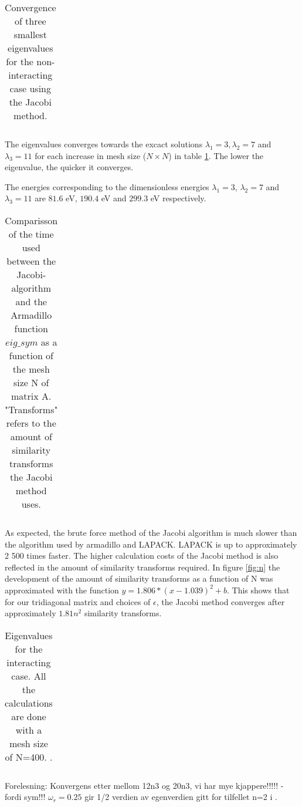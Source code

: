 
\begin{table}[H]\caption{Convergence of three smallest eigenvalues for the non-interacting case using the Jacobi method.}
	\label{tab:eigval}
	\begin{tabular}{cccc}
		
	\end{tabular}
\end{table}

The eigenvalues converges towards the excact solutions  $ \lambda_1=3, \lambda_2 =7  $ and $ \lambda_3 =11 $ for each increase in mesh size  ($ N\times N $) in table \ref{tab:eigval}. The lower the  eigenvalue, the quicker it converges. 

The energies corresponding to the dimensionless energies $\lambda_1 = 3 $, $\lambda_2 = 7 $ and $\lambda_3 = 11$ are $ 81.6 $ eV,  $ 190.4 $ eV and $ 299.3 $ eV respectively. 

\begin{table}[H]\caption{Comparisson of the time used between the Jacobi-algorithm and the Armadillo function  $eig\_sym$ as a function of the mesh size N of matrix A. "Transforms" refers to the amount of similarity transforms the Jacobi method uses.}
	\label{tab:time}
	\begin{tabular}{cccccc}
		
	\end{tabular}
\end{table}


As expected, the brute force method of the Jacobi algorithm is much slower than the algorithm used by armadillo and LAPACK. LAPACK is up to approximately 2 500 times faster. The higher calculation costs of the Jacobi method is also reflected in the amount of similarity transforms required.  In figure \ref{fig:n} the development of the amount of similarity transforms as a function of N was approximated with the function $ y = 1.806*(x-1.039)^2 + b $. This shows that for our tridiagonal matrix and choices of $ \epsilon $, the Jacobi method converges after approximately $1.81n^2 $ similarity transforms. 


\begin{table}[H]\caption{Eigenvalues for the interacting case. All the calculations are done with a mesh size of N=400. . }
	\label{tab:omega}
	\begin{tabular}{cccc}
		
	\end{tabular}
\end{table}



Forelesning: Konvergens etter mellom 12n3 og 20n3, vi har mye kjappere!!!!! - fordi sym!!!
$ \omega_r= 0.25 $ gir 1/2 verdien av egenverdien gitt for tilfellet n=2 i \cite{litterature}. 